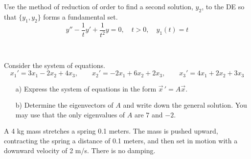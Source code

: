 \documentclass[12pt]{exam}
\begin{document}
    


\newpage \InitialsRight

\begin{questions}

    \question[10] 
    Use the method of reduction of order to find a second solution, $y_2$, to the DE so that $\{y_1,y_2\}$ forms a fundamental set. $$ y'' - \frac 1t y' + \frac{1}{t^2}y = 0, \quad t>0, \quad y_1(t) = t$$


    \newpage \InitialsLeft \\ \Scratch 

    
    \newpage    \InitialsRight
    
        \question[9] Consider the system of equations. 
        $$
        x_1 ' = 3x_1 -2x_2 + 4x_3, \qquad x_2 ' = -2x_1 + 6x_2 + 2x_3 , \qquad x_3 ' = 4x_1 + 2x_2 + 3x_3 
        $$
        \begin{enumerate} 
            \item[a)] Express the system of equations in the form $\vec x \, ' = A \vec x$. \vspace{3cm} 

            \item[b)] Determine the eigenvectors of $A$ and write down the general solution. You may use that the only eigenvalues of $A$ are $7$ and $-2$. 
                
        \end{enumerate}
        
    \newpage \InitialsLeft
    \Scratch 
        

    \newpage \InitialsRight
    
    \question[10] A 4 kg mass stretches a spring 0.1 meters. The mass is pushed upward, contracting the spring a distance of 0.1 meters, and then set in motion with a downward velocity of 2 m/s. There is no damping. 


\end{questions}
\end{document}
